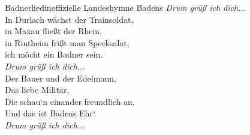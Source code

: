 \begin{lied*}{Badnerlied}{inoffizielle Landeshymne Badens}
\textit{Drum grüß ich dich...}\\

In Durlach wächst der Trainsoldat,\\
in Maxau fließt der Rhein,\\
in Rintheim frißt man Specksalat,\\
ich möcht ein Badner sein.\\

\textit{Drum grüß ich dich...}\\

Der Bauer und der Edelmann,\\
Das liebe Militär,\\
Die schau`n einander freundlich an,\\
Und das ist Badens Ehr`.\\

\textit{Drum grüß ich dich...}\\
\end{lied*}
